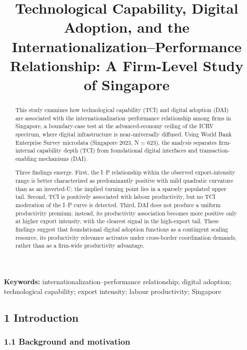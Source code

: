 \documentclass[
  12pt,a4paper]{article}
\title{Technological Capability, Digital Adoption, and the
Internationalization--Performance Relationship: A Firm-Level Study of
Singapore}
\author{}
\date{}
\begin{document}
\maketitle
\begin{abstract}
This study examines how technological capability (TCI) and digital
adoption (DAI) are associated with the internationalization--performance
relationship among firms in Singapore, a boundary-case test at the
advanced-economy ceiling of the ICRV spectrum, where digital
infrastructure is near-universally diffused. Using World Bank Enterprise
Survey microdata (Singapore 2023, N = 623), the analysis separates
firm-internal capability depth (TCI) from foundational digital
interfaces and transaction-enabling mechanisms (DAI).

Three findings emerge. First, the I--P relationship within the observed
export-intensity range is better characterized as predominantly positive
with mild quadratic curvature than as an inverted-U; the implied turning
point lies in a sparsely populated upper tail. Second, TCI is positively
associated with labour productivity, but no TCI moderation of the I--P
curve is detected. Third, DAI does not produce a uniform productivity
premium; instead, its productivity association becomes more positive
only at higher export intensity, with the clearest signal in the
high-export tail. These findings suggest that foundational digital
adoption functions as a contingent scaling resource, its productivity
relevance activates under cross-border coordination demands, rather than
as a firm-wide productivity advantage.
\end{abstract}

\textbf{Keywords:} internationalization--performance relationship;
digital adoption; technological capability; export intensity; labour
productivity; Singapore

\hypertarget{introduction}{%
\subsection{1 Introduction}\label{introduction}}

\hypertarget{background-and-motivation}{%
\subsubsection{1.1 Background and
motivation}\label{background-and-motivation}}
\end{document}
